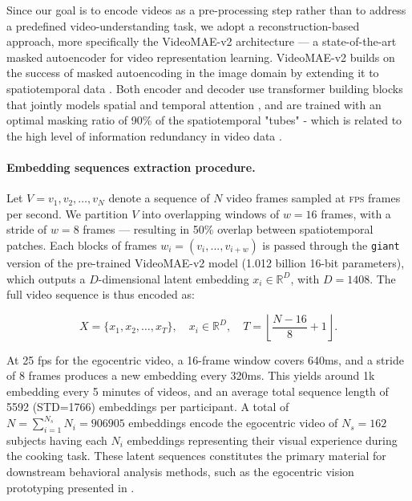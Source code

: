 Since our goal is to encode videos as a pre-processing step rather than to address a predefined video-understanding task, we adopt a reconstruction-based approach, more specifically the VideoMAE-v2 architecture — a state-of-the-art masked autoencoder for video representation learning. VideoMAE-v2 builds on the success of masked autoencoding in the image domain by extending it to spatiotemporal data \cite{MAE, videomae-model}. Both encoder and decoder use transformer building blocks that jointly models spatial and temporal attention \cite{dosovitskiy2021imageworth16x16words}, and are trained with an optimal masking ratio of 90\% of the spatiotemporal "tubes" - which is related to the high level of information redundancy in video data \cite{videomae-model, wang2023videomaev2}.

\paragraph{Embedding sequences extraction procedure.\\}

Let $V = {v_1, v_2, …, v_N}$ denote a sequence of $N$ video frames sampled at \textsc{fps} frames per second. We partition $V$ into overlapping windows of $w=16$ frames, with a stride of $w=8$ frames — resulting in 50\% overlap between spatiotemporal patches. Each blocks of frames $w_i=(v_i, ..., v_{i+w})$ is passed through the \texttt{giant} version of the pre-trained VideoMAE-v2 model (1.012 billion 16-bit parameters), which outputs a $D$-dimensional latent embedding $x_i \in \mathbb{R}^D$, with $D=1408$. The full video sequence is thus encoded as:

$$X = \{x_1, x_2, …, x_T\}, \quad x_i \in \mathbb{R}^D, \quad T = \left\lfloor \frac{N - 16}{8} + 1 \right\rfloor.$$

At 25 fps for the egocentric video, a 16-frame window covers 640ms, and a stride of 8 frames produces a new embedding every 320ms. This yields around 1k embedding every 5 minutes of videos, and an average total sequence length of 5592 (STD=1766) embeddings per participant. A total of $N=\sum_{i=1}^{N_s}N_i = 906905$ embeddings encode the egocentric video of $N_s=162$ subjects having each $N_i$ embeddings representing their visual experience during the cooking task. These latent sequences constitutes the primary material for downstream behavioral analysis methods, such as the egocentric vision prototyping presented in . 

